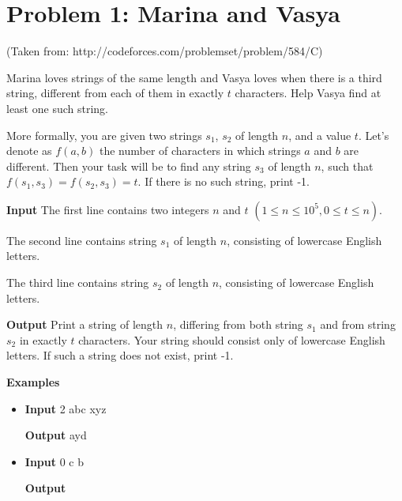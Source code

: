 \normalfont\documentclass[letterpaper,11pt]{article}
\begin{document}
\section*{Problem 1: Marina and Vasya}
(Taken from: http://codeforces.com/problemset/problem/584/C)

Marina loves strings of the same length and Vasya loves when there is a third string, different from each of them in exactly $t$ characters. Help Vasya find at least one such string.

More formally, you are given two strings $s_1$, $s_2$ of length $n$, and a value $t$. Let's denote as $f(a,b)$ the number of characters in which strings $a$ and $b$ are different. Then your task will be to find any string $s_3$ of length $n$, such that $f(s_1, s_3) = f(s_2, s_3) = t$. If there is no such string, print -1.

\textbf{Input} \newline
The first line contains two integers $n$ and $t$ $(1 \leq n \leq 10^5, 0 \leq t \leq n)$.

The second line contains string $s_1$ of length $n$, consisting of lowercase English letters.

The third line contains string $s_2$ of length $n$, consisting of lowercase English letters.

\textbf{Output} \newline
Print a string of length $n$, differing from both string $s_1$ and from string $s_2$ in exactly $t$ characters. Your string should consist only of lowercase English letters. If such a string does not exist, print -1.

\textbf{Examples}
\begin{itemize}
\item \textbf{Input}  2 \newline
abc \newline
xyz

\textbf{Output} \newline
ayd

\item \textbf{Input}  0 \newline
c \newline
b

\textbf{Output} 

\end{itemize}

\newpage
\end{document}
